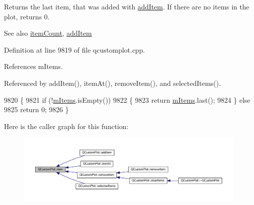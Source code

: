 Returns the last item, that was added with \hyperlink{class_q_custom_plot_aa500620379262321685cb7a7674cbd2a}{add\+Item}. If there are no items in the plot, returns 0.

\begin{DoxySeeAlso}{See also}
\hyperlink{class_q_custom_plot_a6fc860e30df17fd5c46056bf6fe29390}{item\+Count}, \hyperlink{class_q_custom_plot_aa500620379262321685cb7a7674cbd2a}{add\+Item} 
\end{DoxySeeAlso}


Definition at line 9819 of file qcustomplot.\+cpp.



References m\+Items.



Referenced by add\+Item(), item\+At(), remove\+Item(), and selected\+Items().


\begin{DoxyCode}
9820 \{
9821   \textcolor{keywordflow}{if} (!\hyperlink{class_q_custom_plot_a6a93905372326e31e98d6c3bc8953ec8}{mItems}.isEmpty())
9822   \{
9823     \textcolor{keywordflow}{return} \hyperlink{class_q_custom_plot_a6a93905372326e31e98d6c3bc8953ec8}{mItems}.last();
9824   \} \textcolor{keywordflow}{else}
9825     \textcolor{keywordflow}{return} 0;
9826 \}
\end{DoxyCode}


Here is the caller graph for this function\+:\nopagebreak
\begin{figure}[H]
\begin{center}
\leavevmode
\includegraphics[width=350pt]{class_q_custom_plot_a700399eae539798c5baf64a37c7f2135_icgraph}
\end{center}
\end{figure}


\hypertarget{class_q_custom_plot_a793e4b04e0ede11a733021907368fa83}{}
